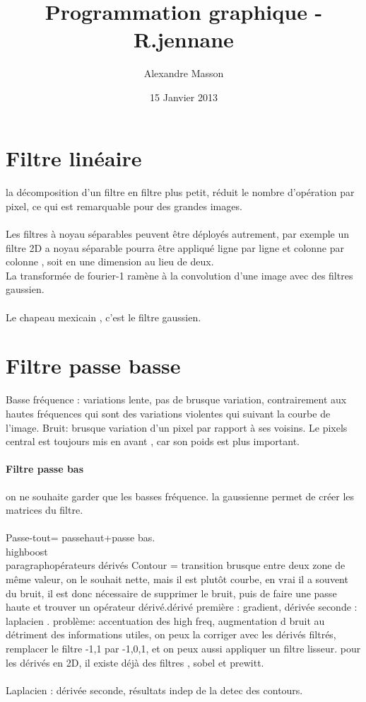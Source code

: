 \documentclass{article}
\title{Programmation graphique - R.jennane}
\author{Alexandre Masson}
\date{15 Janvier 2013}
\begin{document}
\maketitle
\newpage
\tableofcontents
\newpage
\section{Filtre linéaire}
\paragraph{}la décomposition d'un filtre en filtre plus petit, réduit le nombre d'opération par pixel, ce qui est remarquable pour des grandes images.\\\\Les filtres à noyau séparables peuvent être déployés autrement, par exemple un filtre 2D a noyau séparable pourra être appliqué ligne par ligne et colonne par colonne , soit en une dimension au lieu de deux.\\La transformée de fourier-1 ramène à la convolution d'une image avec des filtres gaussien.\\\\
Le chapeau mexicain , c'est le filtre gaussien.
\section{Filtre passe basse} Basse fréquence : variations lente, pas de brusque variation, contrairement aux hautes fréquences qui sont des variations violentes qui suivant la courbe de l'image. Bruit:  brusque variation d'un pixel par rapport à ses voisins. Le pixels central est toujours mis en avant , car son poids est plus important.
\paragraph{Filtre passe bas} on ne souhaite garder que les basses fréquence. la gaussienne permet de créer les matrices du filtre.\\\\Passe-tout= passehaut+passe bas.\\highboost \\paragraph{opérateurs dérivés} Contour  = transition brusque entre deux zone de même valeur, on le souhait nette, mais il est plutôt courbe, en vrai il a souvent du bruit, il est donc nécessaire de supprimer le bruit, puis de faire une passe haute et trouver un opérateur dérivé.dérivé première : gradient, dérivée seconde : laplacien . problème:  accentuation des high freq, augmentation d bruit au détriment des informations utiles, on peux la corriger avec les dérivés filtrés, remplacer le filtre -1,1 par -1,0,1, et on peux aussi appliquer un filtre lisseur. pour les dérivés en 2D, il existe déjà des filtres , sobel et prewitt.\\\\Laplacien : dérivée seconde, résultats indep de la detec des contours.
\end{document}

